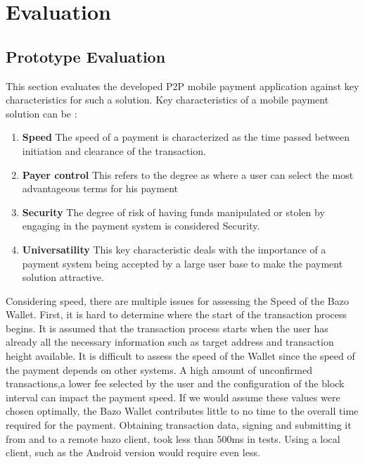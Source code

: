 \chapter{Evaluation}
\section{Prototype Evaluation}
This section evaluates the developed P2P mobile payment application against key characteristics for such a solution. Key characteristics of a mobile payment solution can be :
\begin{enumerate}
\item \textbf{Speed}
The speed of a payment is characterized as the time passed between initiation and clearance of the transaction.
\item \textbf{Payer control}
This refers to the degree as where a user can select the most advantageous terms for his payment
\item \textbf{Security}
The degree of risk of having funds manipulated or stolen by engaging in the payment system is considered Security.
\item \textbf{Universatility}
This key characteristic deals with the importance of a payment system being accepted by a large user base to make the payment solution attractive.
\end{enumerate}


Considering speed, there are multiple issues for assessing the Speed of the Bazo Wallet. First, it is hard to determine where the start of the transaction process begins. It is assumed that the transaction process starts when the user has already all the necessary information such as target address and transaction height available. It is difficult to assess the speed of the Wallet since the speed of the payment depends on other systems. A high amount of unconfirmed transactions,a lower fee selected by the user and the configuration of the block interval can impact the payment speed. If we would assume these values were chosen optimally, the Bazo Wallet contributes little to no time to the overall time required for the payment. Obtaining transaction data, signing and submitting it from and to a remote bazo client, took less than 500ms in tests. Using a local client, such as the Android version would require even less.

